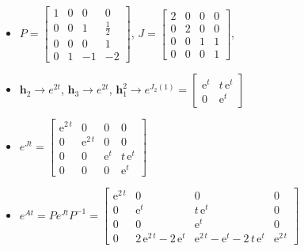\documentclass{article}
\begin{document}
\begin{itemize}
    \item 
    $
        P = 
        \begin{bmatrix}
            1 & 0 &  0 & 0\\
            0 & 0 &  1 & \frac{1}{2}\\
            0 & 0 &  0 & 1\\
            0 & 1 & -1 &-2
        \end{bmatrix}
    $,
    $
        J = 
        \begin{bmatrix}
            2 & 0 &  0 & 0\\
            0 & 2 &  0 & 0\\
            0 & 0 &  1 & 1\\
            0 & 0 &  0 & 1
        \end{bmatrix}
    $,
    \item
    $
        \mathbf{h}_{2} \rightarrow e^{2t}
    $,
    $
        \mathbf{h}_{3} \rightarrow e^{2t}
    $,
    $
        \mathbf{h}_{1}^{2} \rightarrow
        e^{J_{2}(1)}
        =
        \left[\begin{array}{cc} {\mathrm{e}}^t & t\,{\mathrm{e}}^t\\ 0 & {\mathrm{e}}^t \end{array}\right]
    $
    \item 
    $
        e^{Jt}
        =
        \left[\begin{array}{cccc} {\mathrm{e}}^{2\,t} & 0 & 0 & 0\\ 0 & {\mathrm{e}}^{2\,t} & 0 & 0\\ 0 & 0 & {\mathrm{e}}^t & t\,{\mathrm{e}}^t\\ 0 & 0 & 0 & {\mathrm{e}}^t \end{array}\right]
    $
    \item
    $
        e^{At}
        =
        P e^{Jt} P^{-1}
        =
        \left[\begin{array}{cccc} {\mathrm{e}}^{2\,t} & 0 & 0 & 0\\ 0 & {\mathrm{e}}^t & t\,{\mathrm{e}}^t & 0\\ 0 & 0 & {\mathrm{e}}^t & 0\\ 0 & 2\,{\mathrm{e}}^{2\,t}-2\,{\mathrm{e}}^t & {\mathrm{e}}^{2\,t}-{\mathrm{e}}^t-2\,t\,{\mathrm{e}}^t & {\mathrm{e}}^{2\,t} \end{array}\right]
    $
\end{itemize}
\end{document}
